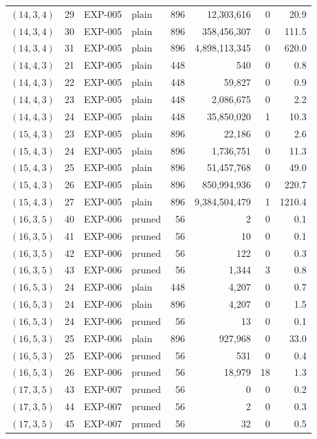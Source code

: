 \begin{longtable}{lrllrrrr}
$(14,3,4)$ & 29 & EXP-005 & plain & 896 & 12{,}303{,}616 & 0 & 20.9 \\
$(14,3,4)$ & 30 & EXP-005 & plain & 896 & 358{,}456{,}307 & 0 & 111.5 \\
$(14,3,4)$ & 31 & EXP-005 & plain & 896 & 4{,}898{,}113{,}345 & 0 & 620.0 \\
$(14,4,3)$ & 21 & EXP-005 & plain & 448 & 540 & 0 & 0.8 \\
$(14,4,3)$ & 22 & EXP-005 & plain & 448 & 59{,}827 & 0 & 0.9 \\
$(14,4,3)$ & 23 & EXP-005 & plain & 448 & 2{,}086{,}675 & 0 & 2.2 \\
$(14,4,3)$ & 24 & EXP-005 & plain & 448 & 35{,}850{,}020 & 1 & 10.3 \\
$(15,4,3)$ & 23 & EXP-005 & plain & 896 & 22{,}186 & 0 & 2.6 \\
$(15,4,3)$ & 24 & EXP-005 & plain & 896 & 1{,}736{,}751 & 0 & 11.3 \\
$(15,4,3)$ & 25 & EXP-005 & plain & 896 & 51{,}457{,}768 & 0 & 49.0 \\
$(15,4,3)$ & 26 & EXP-005 & plain & 896 & 850{,}994{,}936 & 0 & 220.7 \\
$(15,4,3)$ & 27 & EXP-005 & plain & 896 & 9{,}384{,}504{,}479 & 1 & 1210.4 \\
$(16,3,5)$ & 40 & EXP-006 & pruned & 56 & 2 & 0 & 0.1 \\
$(16,3,5)$ & 41 & EXP-006 & pruned & 56 & 10 & 0 & 0.1 \\
$(16,3,5)$ & 42 & EXP-006 & pruned & 56 & 122 & 0 & 0.3 \\
$(16,3,5)$ & 43 & EXP-006 & pruned & 56 & 1{,}344 & 3 & 0.8 \\
$(16,5,3)$ & 24 & EXP-006 & plain & 448 & 4{,}207 & 0 & 0.7 \\
$(16,5,3)$ & 24 & EXP-006 & plain & 896 & 4{,}207 & 0 & 1.5 \\
$(16,5,3)$ & 24 & EXP-006 & pruned & 56 & 13 & 0 & 0.1 \\
$(16,5,3)$ & 25 & EXP-006 & plain & 896 & 927{,}968 & 0 & 33.0 \\
$(16,5,3)$ & 25 & EXP-006 & pruned & 56 & 531 & 0 & 0.4 \\
$(16,5,3)$ & 26 & EXP-006 & pruned & 56 & 18{,}979 & 18 & 1.3 \\
$(17,3,5)$ & 43 & EXP-007 & pruned & 56 & 0 & 0 & 0.2 \\
$(17,3,5)$ & 44 & EXP-007 & pruned & 56 & 2 & 0 & 0.3 \\
$(17,3,5)$ & 45 & EXP-007 & pruned & 56 & 32 & 0 & 0.5 \\

\end{longtable}
